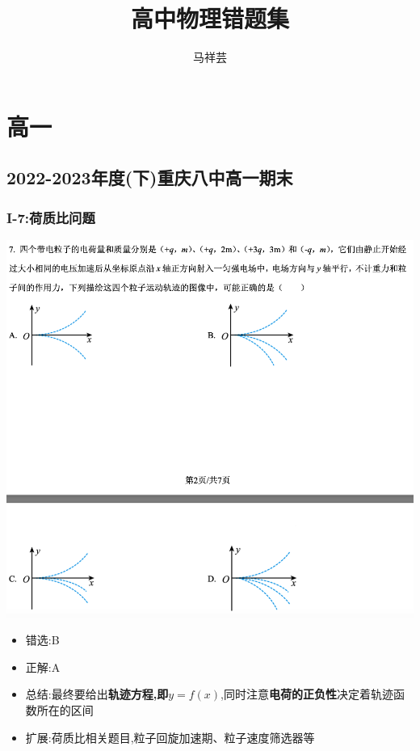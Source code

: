\documentclass{article}
\title{高中物理错题集}
\author{马祥芸}
\begin{document}
\maketitle
\tableofcontents
\newpage

\section{高一}

\subsection{2022-2023年度(下)重庆八中高一期末}

\subsubsection{I-7:荷质比问题}
\includegraphics[width=50em,keepaspectratio]{./pictures/1.1-1.png}

\begin{itemize}
    \item 错选:\quad B
    \item 正解:\quad A
    \item 总结:最终要给出\textbf{轨迹方程,即$ y = f(x) $},同时注意\textbf{电荷的正负性}决定着轨迹函数所在的区间
    \item 扩展:荷质比相关题目,粒子回旋加速期、粒子速度筛选器等
\end{itemize}
\end{document}
